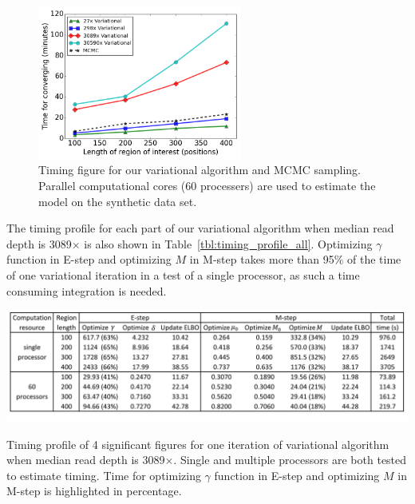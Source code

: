 \documentclass[11pt,reqno]{amsart}
\begin{document}
\begin{figure}[h]
\centering
\includegraphics[width=0.6\textwidth]{figs/timing_var_mcmc.png}
\caption{Timing figure for our variational algorithm and MCMC sampling.
Parallel computational cores (60 processers) are used to estimate the model on the synthetic data set.}
\label{tbl:timing_mcmc_var}
\end{figure}

The timing profile for each part of our variational algorithm when median read depth is 3089$\times$ is also shown in Table~\ref{tbl:timing_profile_all}.
Optimizing $\gamma$ function in E-step and optimizing $M$ in M-step takes more than 95\% of the time of one variational iteration in a test of a single processor, as such a time consuming integration is needed.

\begin{table}[htbp]
\centering
\vspace{10pt}
\includegraphics[width=1.0\textwidth]{tables/time_3089X_all_update.png}
\caption{Timing profile of 4 significant figures for one iteration of variational algorithm when median read depth is 3089$\times$.
Single and multiple processors are both tested to estimate timing. Time for optimizing $\gamma$ function in E-step and optimizing $M$ in M-step is highlighted in percentage.}
\label{tbl:timing_profile_all}
\end{table}
\end{document}
